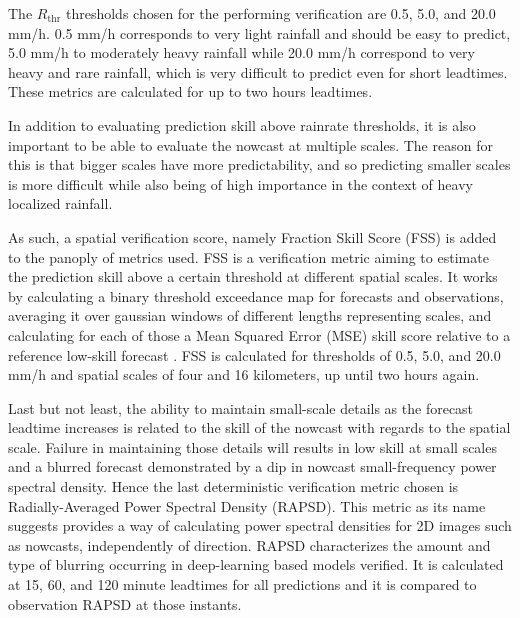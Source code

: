 The $R_{\text{thr}}$ thresholds chosen for the performing verification are 0.5, 5.0, and 20.0 mm/h. 0.5 mm/h corresponds to very light rainfall and should be easy to predict, 5.0 mm/h to moderately heavy rainfall while 20.0 mm/h correspond to very heavy and rare rainfall, which is very difficult to predict even for short leadtimes. These metrics are calculated for up to two hours leadtimes. 

In addition to evaluating prediction skill above rainrate thresholds, it is also important to be able to evaluate the nowcast at multiple scales. The reason for this is that bigger scales have more predictability, and so predicting smaller scales is more difficult while also being of high importance in the context of heavy localized rainfall. 


As such, a spatial verification score, namely Fraction Skill Score (FSS) \cite{roberts_scale-selective_2008} is added to the panoply of metrics used. FSS is a verification metric aiming to estimate the prediction skill above a certain threshold at different spatial scales. It works by calculating a binary threshold exceedance map for forecasts and observations, averaging it over gaussian windows of different lengths representing scales, and calculating for each of those a Mean Squared Error (MSE) skill score relative to a reference low-skill forecast \cite{roberts_scale-selective_2008}. FSS is calculated for thresholds of 0.5, 5.0, and 20.0 mm/h and spatial scales of four and 16 kilometers, up until two hours again. 

Last but not least, the ability to maintain small-scale details as the forecast leadtime increases is related to the skill of the nowcast with regards to the spatial scale. Failure in maintaining those details will results in low skill at small scales and a blurred forecast demonstrated by a dip in nowcast small-frequency power spectral density. Hence the last deterministic verification metric chosen is Radially-Averaged Power Spectral Density (RAPSD). This metric as its name suggests provides a way of calculating power spectral densities for 2D images such as nowcasts, independently of direction. RAPSD characterizes the amount and type of blurring occurring in deep-learning based models verified. It is calculated at 15, 60, and 120 minute leadtimes for all predictions and it is compared to observation RAPSD at those instants. 

